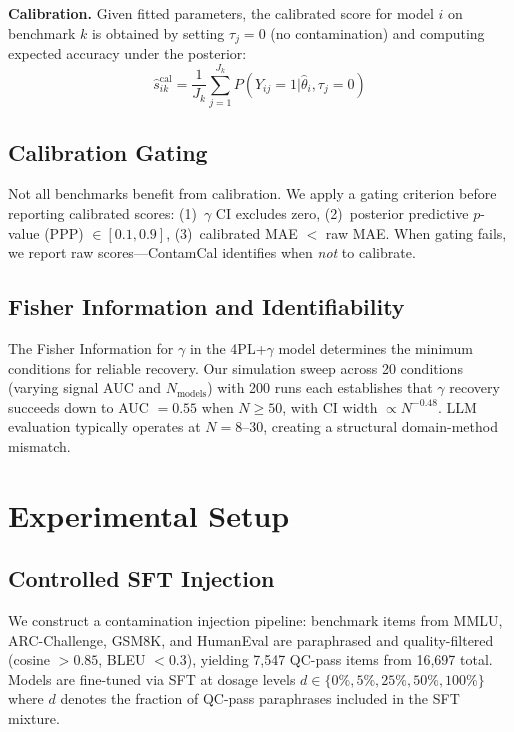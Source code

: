 \documentclass[11pt,a4paper]{article}
\begin{document}
\textbf{Calibration.} Given fitted parameters, the calibrated score for model $i$ on benchmark $k$ is obtained by setting $\tau_j = 0$ (no contamination) and computing expected accuracy under the posterior:
\begin{equation}
\hat{s}_{ik}^{\text{cal}} = \frac{1}{J_k} \sum_{j=1}^{J_k} P(Y_{ij}=1 | \hat{\theta}_i, \tau_j = 0)
\end{equation}

\subsection{Calibration Gating}
\label{sec:gating}

Not all benchmarks benefit from calibration. We apply a gating criterion before reporting calibrated scores: (1)~$\gamma$ CI excludes zero, (2)~posterior predictive $p$-value (PPP) $\in [0.1, 0.9]$, (3)~calibrated MAE $<$ raw MAE. When gating fails, we report raw scores---ContamCal identifies when \emph{not} to calibrate.

\subsection{Fisher Information and Identifiability}

The Fisher Information for $\gamma$ in the 4PL+$\gamma$ model determines the minimum conditions for reliable recovery. Our simulation sweep across 20 conditions (varying signal AUC and $N_{\text{models}}$) with 200 runs each establishes that $\gamma$ recovery succeeds down to AUC $= 0.55$ when $N \geq 50$, with CI width $\propto N^{-0.48}$. LLM evaluation typically operates at $N = 8$--$30$, creating a structural domain-method mismatch.

\section{Experimental Setup}

\subsection{Controlled SFT Injection}

We construct a contamination injection pipeline: benchmark items from MMLU, ARC-Challenge, GSM8K, and HumanEval are paraphrased and quality-filtered (cosine $> 0.85$, BLEU $< 0.3$), yielding 7,547 QC-pass items from 16,697 total. Models are fine-tuned via SFT at dosage levels $d \in \{0\%, 5\%, 25\%, 50\%, 100\%\}$ where $d$ denotes the fraction of QC-pass paraphrases included in the SFT mixture.
\end{document}
